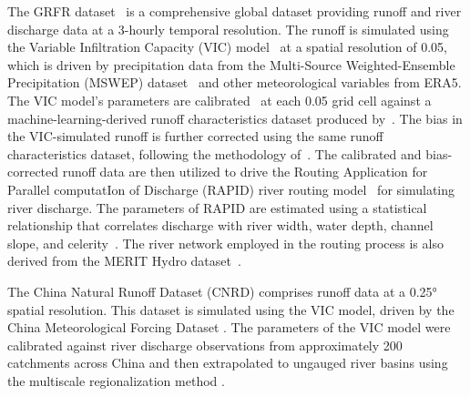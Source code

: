 \documentclass[preprint, review, authoryear, longtitle, 12pt, 3p]{elsarticle}
\begin{document}
The GRFR dataset~\citep{yang2021BAMS} is a comprehensive global dataset providing runoff and river discharge data at a 3-hourly temporal resolution. The runoff is simulated using the Variable Infiltration Capacity (VIC) model~\citep{liang1994JGRA} at a spatial resolution of 0.05\textdegree, which is driven by precipitation data from the Multi-Source Weighted-Ensemble Precipitation (MSWEP) dataset~\citep{beck2019BAMS} and other meteorological variables from ERA5. The VIC model's parameters are calibrated~\citep{yang2019WRR} at each 0.05\textdegree{} grid cell against a machine-learning-derived runoff characteristics dataset produced by~\citet{beck2015JHM}. The bias in the VIC-simulated runoff is further corrected using the same runoff characteristics dataset, following the methodology of~\citet{lin2019WRR}. The calibrated and bias-corrected runoff data are then utilized to drive the Routing Application for Parallel computatIon of Discharge (RAPID) river routing model~\citep{david2011JHM} for simulating river discharge. The parameters of RAPID are estimated using a statistical relationship that correlates discharge with river width, water depth, channel slope, and celerity~\citep{lin2019WRR}. The river network employed in the routing process is also derived from the MERIT Hydro dataset~\citep{lin2021SD}.

The China Natural Runoff Dataset (CNRD) \citep{gou2021BAMS, miao2022CSB} comprises runoff data at a 0.25° spatial resolution. This dataset is simulated using the VIC model, driven by the China Meteorological Forcing Dataset \citep{he2020SD}. The parameters of the VIC model were calibrated against river discharge observations from approximately 200 catchments across China and then extrapolated to ungauged river basins using the multiscale regionalization method \citep{samaniego2010WRR}.
\end{document}
